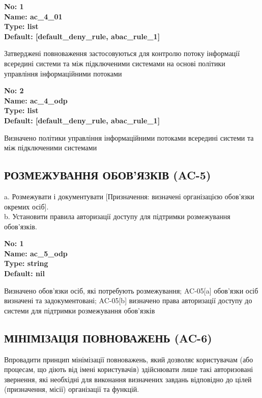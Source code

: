 \documentclass{article}
\begin{document}
\vspace{10pt}
{\footnotesize\bfseries
No: 1\\
Name: ac\_\allowbreak{}4\_\allowbreak{}01\\
Type: list\\
Default: [\textquotedbl{}default\_\allowbreak{}deny\_\allowbreak{}rule\textquotedbl{}, \textquotedbl{}abac\_\allowbreak{}rule\_\allowbreak{}1\textquotedbl{}]
}

{\footnotesize Затверджені повноваження застосовуються для контролю потоку інформації всередині системи та між підключеними системами на основі політики управління інформаційними потоками}


{\footnotesize\bfseries
No: 2\\
Name: ac\_\allowbreak{}4\_\allowbreak{}odp\\
Type: list\\
Default: [\textquotedbl{}default\_\allowbreak{}deny\_\allowbreak{}rule\textquotedbl{}, \textquotedbl{}abac\_\allowbreak{}rule\_\allowbreak{}1\textquotedbl{}]
}

{\footnotesize Визначено політики управління інформаційними потоками всередині системи та між підключеними системами}




\subsection{РОЗМЕЖУВАННЯ ОБОВ'ЯЗКІВ (AC-5)}
a. Розмежувати і документувати [Призначення: визначені організацією обов'язки окремих осіб].\\ 
b. Установити правила авторизації доступу для підтримки розмежування обов'язків.

\vspace{10pt}
{\footnotesize\bfseries
No: 1\\
Name: ac\_\allowbreak{}5\_\allowbreak{}odp\\
Type: string\\
Default: nil
}

{\footnotesize Визначено обов'язки осіб, які потребують розмежування; AC-05[a] обов'язки осіб визначені та задокументовані; AC-05[b] визначено права авторизації доступу до системи для підтримки розмежування обов'язків}




\subsection{МІНІМІЗАЦІЯ ПОВНОВАЖЕНЬ (AC-6)}
Впровадити принцип мінімізації повноважень, який дозволяє користувачам (або процесам, що діють від імені користувачів) здійснювати лише такі авторизовані звернення, які необхідні для виконання визначених завдань відповідно до цілей (призначення, місії) організації та функцій.
\end{document}
